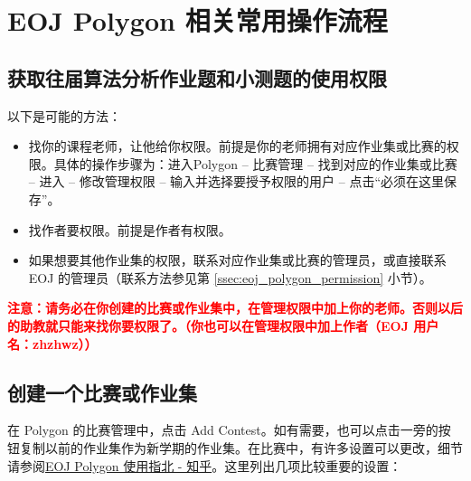 \documentclass[oneside]{book}
\begin{document}
\section{EOJ Polygon 相关常用操作流程}

\label{sec:polygon_operating_procedures}

\subsection{获取往届算法分析作业题和小测题的使用权限}

\label{ssec:permission_get}

以下是可能的方法：

\begin{itemize}
    \item 找你的课程老师，让他给你权限。前提是你的老师拥有对应作业集或比赛的权限。具体的操作步骤为：进入Polygon -- 比赛管理 -- 找到对应的作业集或比赛 -- 进入 -- 修改管理权限 -- 输入并选择要授予权限的用户 -- 点击``必须在这里保存''。
    \item 找作者要权限。前提是作者有权限。
    \item 如果想要其他作业集的权限，联系对应作业集或比赛的管理员，或直接联系 EOJ 的管理员（联系方法参见第 \ref{ssec:eoj_polygon_permission} 小节）。
\end{itemize}

\textbf{\textcolor{red}{注意：请务必在你创建的比赛或作业集中，在管理权限中加上你的老师。否则以后的助教就只能来找你要权限了。（你也可以在管理权限中加上作者（EOJ 用户名：zhzhwz））}}

\subsection{创建一个比赛或作业集}

\label{ssec:create_contest}

在 Polygon 的比赛管理中，点击 Add Contest。如有需要，也可以点击一旁的按钮复制以前的作业集作为新学期的作业集。在比赛中，有许多设置可以更改，细节请参阅\href{https://zhuanlan.zhihu.com/p/59869879}{EOJ Polygon 使用指北 - 知乎}。这里列出几项比较重要的设置：
\end{document}
